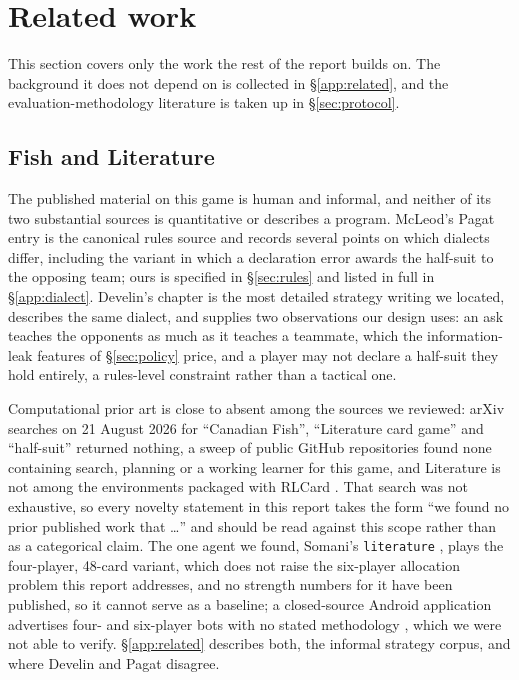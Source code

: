 \section{Related work}
\label{sec:related}

This section covers only the work the rest of the report builds on. The
background it does not depend on is collected in \S\ref{app:related}, and the
evaluation-methodology literature is taken up in \S\ref{sec:protocol}.

\subsection{Fish and Literature}

The published material on this game is human and informal, and neither of its
two substantial sources is quantitative or describes a program. McLeod's Pagat
entry \cite{pagat} is the canonical rules source and records several points on
which dialects differ, including the variant in which a declaration error awards
the half-suit to the opposing team; ours is specified in \S\ref{sec:rules} and
listed in full in \S\ref{app:dialect}. Develin's chapter \cite{develin} is the
most detailed strategy writing we located, describes the same dialect, and
supplies two observations our design uses: an ask teaches the opponents as much
as it teaches a teammate, which the information-leak features of
\S\ref{sec:policy} price, and a player may not declare a half-suit they hold
entirely, a rules-level constraint rather than a tactical one.

Computational prior art is close to absent among the sources we reviewed:
arXiv searches on 21 August 2026 for ``Canadian Fish'', ``Literature card
game'' and ``half-suit'' returned nothing, a sweep of public GitHub
repositories found none containing search, planning or a working learner for
this game, and Literature is not among the environments packaged with RLCard
\cite{rlcard}. That search was not exhaustive, so every novelty statement in
this report takes the form ``we found no prior published work that \dots'' and
should be read against this scope rather than as a categorical claim. The one
agent we found, Somani's \texttt{literature} \cite{somani,somani-server}, plays
the four-player, 48-card variant, which does not raise the six-player
allocation problem this report addresses, and no strength numbers for it have
been published, so it cannot serve as a baseline; a closed-source Android
application advertises four- and six-player bots with no stated methodology
\cite{playstore}, which we were not able to verify. \S\ref{app:related}
describes both, the informal strategy corpus, and where Develin and Pagat
disagree.

